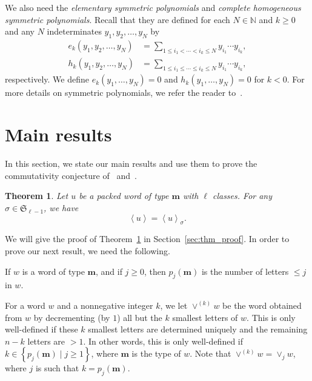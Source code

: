 \documentclass[reqno]{amsart}
\newcommand{\0}{\phantom{c}}
\newcommand{\swt}[1]{\left\langle #1 \right\rangle} %
\newcommand{\merge}[1]{\vee_{#1}} %
\newcommand{\SymGp}[1]{\mathfrak{S}_{#1}} %
\newcommand{\mm}{\mathbf{m}}
\newcommand{\NN}{\mathbb{N}}
\let\sumnonlimits\sum
\renewcommand{\sum}{\sumnonlimits\limits}
\newcommand{\set}[1]{\left\{ #1 \right\}}
\newcommand{\defn}[1]{{\color{darkred}\emph{#1}}} %
\theoremstyle{plain}
\newtheorem{thm}{Theorem}[section]
\theoremstyle{definition}
\numberwithin{equation}{section}
\begin{document}
We also need the \defn{elementary symmetric polynomials} and \defn{complete homogeneous symmetric polynomials}.
Recall that they are defined for each $N \in \NN$ and $k \geq 0$ and any $N$ indeterminates $y_1, y_2, \ldots, y_N$ by
\begin{align*}
e_k(y_1, y_2, \dotsc, y_N) & = \sum_{1 \leq i_1 < \cdots < i_k \leq N} y_{i_1} \dotsm y_{i_k},
\\ h_k(y_1, y_2, \dotsc, y_N) & = \sum_{1 \leq i_1 \leq \cdots \leq i_k \leq N} y_{i_1} \dotsm y_{i_k},
\end{align*}
respectively.
We define $e_k(y_1, \dotsc, y_N) = 0$ and $h_k(y_1, \dotsc, y_N) = 0$ for $k < 0$.
For more details on symmetric polynomials, we refer the reader to~\cite[Ch.~7]{Stanley-EC2}.








\section{Main results}
\label{sec:result}


In this section, we state our main results and use them to prove the commutativity conjecture of~\cite{AAMP} and~\cite[Conj.~3.10]{AasLin17}.

\begin{thm}
\label{thm:permutation}
  Let $u$ be a packed word of type $\mm$ with $\ell$ classes.
  For any $\sigma \in \SymGp{\ell-1}$, we have 
  \[
  \swt{u} = \swt{u}_{\sigma}.
  \]
\end{thm}

We will give the proof of Theorem~\ref{thm:permutation} in Section~\ref{sec:thm_proof}.
In order to prove our next result, we need the following.

If $w$ is a word of type $\mm$, and if $j \geq 0$, then $p_j(\mm)$ is the number of letters $\leq j$ in $w$.

For a word $w$ and a nonnegative integer $k$, we let \defn{$\vee^{(k)} w$} be the word obtained from $w$ by decrementing (by $1$) all but the $k$ smallest letters of $w$.
This is only well-defined if these $k$ smallest letters are determined uniquely and the remaining $n-k$ letters are $> 1$.
In other words, this is only well-defined if $k \in \set{ p_j(\mm) \mid j \geq 1 }$, where $\mm$ is the type of $w$.
Note that $\vee^{(k)} w = \merge{j} w$, where $j$ is such that $k = p_j(\mm)$.
\end{document}
